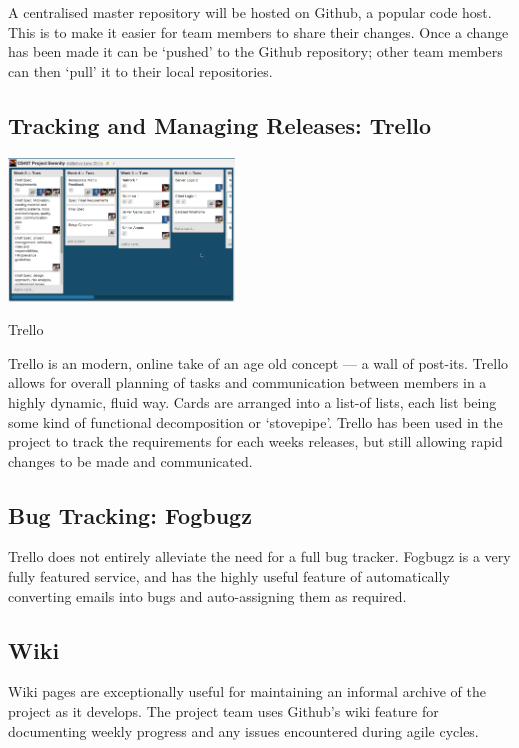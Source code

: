 \begin{fullwidth}
A centralised master repository will be hosted on Github, a popular code host. 
This is to make it easier for team members to share their changes. Once a change has been made
it can be `pushed' to the Github repository; other team members can then `pull' it to their local
repositories.

\subsection{Tracking and Managing Releases: Trello}

\begin{marginfigure}
	\includegraphics[width=6cm]{res/trello.png}
	\caption{Trello}
	\label{fig:trello}
\end{marginfigure}

Trello is an modern, online take of an age old concept --- a wall of post-its. Trello allows for overall planning of tasks and communication between members in a highly dynamic, fluid way. Cards are arranged into a list-of lists, each list being some kind of functional decomposition or `stovepipe'. Trello has been used in the project to track the requirements for each weeks releases, but still allowing rapid changes to be made and communicated.

\subsection{Bug Tracking: Fogbugz}

Trello does not entirely alleviate the need for a full bug tracker. Fogbugz is a very fully featured service, and has the highly useful feature of automatically converting emails into bugs and auto-assigning them as required.

\subsection{Wiki}
Wiki pages are exceptionally useful for maintaining an informal archive of the project as it develops. The project team uses Github's wiki feature for documenting weekly progress and any issues encountered during agile cycles.


\end{fullwidth}

